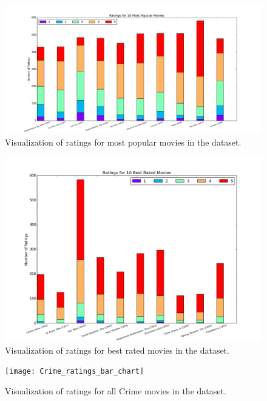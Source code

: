 \pagebreak

\begin{figure}[H]
\centering
\includegraphics[width=\textwidth]{most-popular}
\caption{Visualization of ratings for most popular movies in the dataset.}
\end{figure}

\pagebreak

\begin{figure}[H]
\centering
\includegraphics[width=\textwidth]{best-rated}
\caption{Visualization of ratings for best rated movies in the dataset.}
\end{figure}

\pagebreak

\begin{figure}[H]
\centering
\texttt{[image: Crime\_ratings\_bar\_chart]}
\caption{Visualization of ratings for all Crime movies in the dataset.}
\end{figure}

\pagebreak

